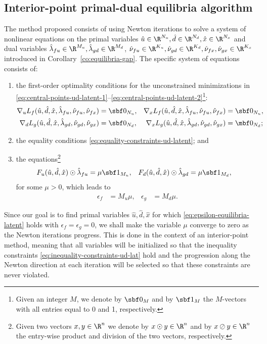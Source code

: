 \documentclass[11pt]{article}
\begin{document}
\subsection{Interior-point primal-dual equilibria algorithm}

The method proposed consists of using Newton iterations to solve a
system of nonlinear equations on the primal variables $\hat
u\in\R^{N_u},\hat d\in\R^{N_d},\hat x\in\R^{N_x}$ and dual variables
$\hat\lambda_{fu}\in\R^{M_u},\hat\lambda_{gd}\in\R^{M_d}$,
$\hat\nu_{fu}\in\R^{K_u},\hat\nu_{gd}\in\R^{K_d},\hat\nu_{fx},\hat\nu_{gx}\in\R^{K_x}$ introduced in
Corollary~\ref{co:equilibria-gap}. The specific system of equations
consists of:
\begin{enumerate}
\item the first-order optimality conditions for the unconstrained
  minimizations in
  \eqref{eq:central-points-ud-latent-1}--\eqref{eq:central-points-ud-latent-2}\footnote{Given
    an integer $M$, we denote by $\sbf 0_M$ and by $\sbf 1_M$ the
    $M$-vectors with all entries equal to 0 and 1, respectively.}:
  \begin{subequations}\label{eq:equilibrium-latent}
    \begin{align}
      \nabla_u L_f(\hat u,\hat d,\hat
      x,\hat\lambda_{fu},\hat\nu_{fu},\hat\nu_{fx})&=\sbf 0_{N_u}, &
      \nabla_x L_f(\hat u,\hat d,\hat x,\hat\lambda_{fu},\hat\nu_{fu},\hat\nu_{fx})&=\sbf 0_{N_u}, \\
      \nabla_d L_g(\hat u,\hat d,\hat
      x,\hat\lambda_{gd},\hat\nu_{gd},\hat\nu_{gx})&=\sbf 0_{N_d}, & \nabla_x
      L_g(\hat u,\hat d,\hat x,\hat\lambda_{gd},\hat\nu_{gd},\hat\nu_{gx})&=\mbf
      0_{N_d}; &
    \end{align}
  \end{subequations}
\item the equality conditions \eqref{eq:equality-constraints-ud-latent}; and
\item the equations\footnote{Given two vectors $x,y\in\R^n$ we denote by
    $x\odot y\in\R^n$ and by $x\oslash y\in\R^n$ the entry-wise product and
    division of the two vectors, respectively.}
  \begin{align}\label{eq:barrier-ud-latent}
    F_u(\hat u,\hat d,\hat x)\odot\hat\lambda_{fu}&=\mu\sbf 1_{M_u}, &
    F_d(\hat u,\hat d,\hat x)\odot\hat\lambda_{gd}&=\mu\sbf 1_{M_d}, &
  \end{align}
  for some $\mu>0$, which leads to
  \begin{align*}
    \epsilon_f&=M_u \mu, & \epsilon_g&=M_d \mu.
  \end{align*}
\end{enumerate}
Since our goal is to find primal variables $\hat u,\hat d,\hat x$ for which
\eqref{eq:epsilon-equilibria-latent} holds with $\epsilon_f=\epsilon_g=0$, we shall make
the variable $\mu$ converge to zero as the Newton iterations
progress. This is done in the context of an interior-point method,
meaning that all variables will be initialized so that the inequality
constraints \eqref{eq:inequality-constraints-ud-lat} hold and the progression
along the Newton direction at each iteration will be selected so that
these constraints are never violated.
\end{document}
